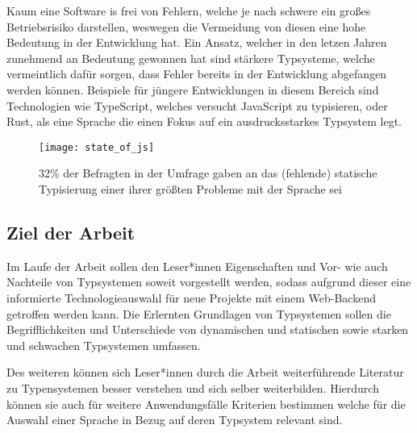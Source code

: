Kaum eine Software is frei von Fehlern, welche je nach schwere ein großes Betriebsrisiko darstellen, weswegen die Vermeidung von diesen eine hohe Bedeutung
in der Entwicklung hat. 
Ein Ansatz, welcher in den letzen Jahren zunehmend an Bedeutung gewonnen hat sind stärkere Typsysteme, welche vermeintlich dafür sorgen, dass Fehler bereits
in der Entwicklung abgefangen werden können.
Beispiele für jüngere Entwicklungen in diesem Bereich sind Technologien wie TypeScript, welches versucht JavaScript zu typisieren, oder Rust, als eine Sprache die einen Fokus auf
ein ausdrucksstarkes Typsystem legt.

\begin{figure}[H]
  \centering
  \texttt{[image: state\_of\_js]}
  \caption{32\% der Befragten in der  Umfrage gaben an das (fehlende) statische Typisierung einer ihrer größten Probleme mit der Sprache sei \cite{Greif_Burel_2024}}
\end{figure}

\subsection{Ziel der Arbeit} 
Im Laufe der Arbeit sollen den Leser*innen Eigenschaften und Vor- wie auch Nachteile von Typsystemen soweit vorgestellt werden,
sodass aufgrund dieser eine informierte Technologieauswahl für neue Projekte mit einem Web-Backend getroffen werden kann.
Die Erlernten Grundlagen von Typsystemen sollen die Begrifflichkeiten und Unterschiede 
von dynamischen und statischen sowie starken und schwachen Typsystemen umfassen. 

Des weiteren können sich Leser*innen durch die Arbeit weiterführende Literatur zu Typensystemen besser verstehen und sich selber weiterbilden.
Hierdurch können sie auch für weitere Anwendungsfälle Kriterien bestimmen welche für die Auswahl einer Sprache in Bezug auf deren Typsystem relevant sind.
